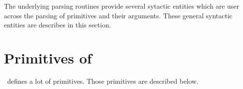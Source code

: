 \documentclass{extex-doc}
\begin{document}
The underlying parsing routines provide several sytactic entities
which are user across the parsing of primitives and their arguments.
These general syntactic entities are describes in this section.


\section{Primitives of \ExTeX}

\ExTeX\ defines a lot of primitives. Those primitives are described below.



\appendix





{\scriptsize\printindex}
\end{document}
